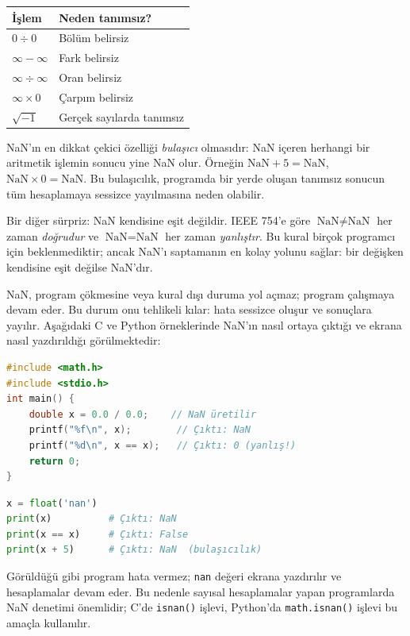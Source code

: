 \begin{center}
\small
\begin{tabular}{l l}
\toprule
\textbf{İşlem} & \textbf{Neden tanımsız?} \\
\midrule
$0 \div 0$ & Bölüm belirsiz \\
$\infty - \infty$ & Fark belirsiz \\
$\infty \div \infty$ & Oran belirsiz \\
$\infty \times 0$ & Çarpım belirsiz \\
$\sqrt{-1}$ & Gerçek sayılarda tanımsız \\
\bottomrule
\end{tabular}
\end{center}

NaN'ın en dikkat çekici özelliği \emph{bulaşıcı} olmasıdır: NaN içeren herhangi bir aritmetik işlemin sonucu yine NaN olur. Örneğin $\text{NaN} + 5 = \text{NaN}$, $\text{NaN} \times 0 = \text{NaN}$. Bu bulaşıcılık, programda bir yerde oluşan tanımsız sonucun tüm hesaplamaya sessizce yayılmasına neden olabilir.

Bir diğer sürpriz: NaN kendisine eşit değildir. IEEE 754'e göre $\text{NaN} \neq \text{NaN}$ her zaman \emph{doğrudur} ve $\text{NaN} = \text{NaN}$ her zaman \emph{yanlıştır}. Bu kural birçok programcı için beklenmediktir; ancak NaN'ı saptamanın en kolay yolunu sağlar: bir değişken kendisine eşit değilse NaN'dır.

\begin{bilginot}
NaN, program çökmesine veya kural dışı duruma yol açmaz; program çalışmaya devam eder. Bu durum onu tehlikeli kılar: hata sessizce oluşur ve sonuçlara yayılır. Aşağıdaki C ve Python örneklerinde NaN'ın nasıl ortaya çıktığı ve ekrana nasıl yazdırıldığı görülmektedir:

\begin{lstlisting}[language=C, xleftmargin=2em]
#include <math.h>
#include <stdio.h>
int main() {
    double x = 0.0 / 0.0;    // NaN üretilir
    printf("%f\n", x);        // Çıktı: NaN
    printf("%d\n", x == x);   // Çıktı: 0 (yanlış!)
    return 0;
}
\end{lstlisting}

\begin{lstlisting}[language=Python, xleftmargin=2em]
x = float('nan')
print(x)          # Çıktı: NaN
print(x == x)     # Çıktı: False
print(x + 5)      # Çıktı: NaN  (bulaşıcılık)
\end{lstlisting}

Görüldüğü gibi program hata vermez; \texttt{nan} değeri ekrana yazdırılır ve hesaplamalar devam eder. Bu nedenle sayısal hesaplamalar yapan programlarda NaN denetimi önemlidir; C'de \texttt{isnan()} işlevi, Python'da \texttt{math.isnan()} işlevi bu amaçla kullanılır.
\end{bilginot}

